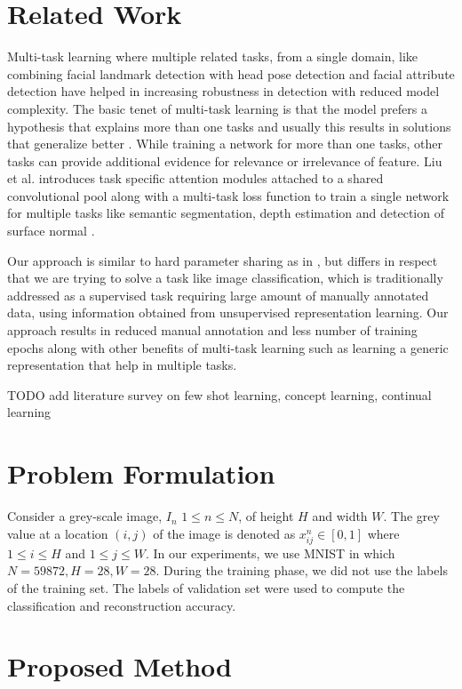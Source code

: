 \documentclass{uai2021} %
\begin{document}
\section{Related Work} \label{related_works}
Multi-task learning where multiple related tasks, from a single domain, like combining facial landmark detection with head pose detection and facial attribute detection \cite{zhang2014facial} have helped in increasing robustness in detection with reduced model complexity.
The basic tenet of multi-task learning is that the model prefers a hypothesis that explains more than one tasks and usually this results in solutions that generalize better \cite{ruder2017overview}.
While training a network for more than one tasks, other tasks can provide additional evidence for relevance or irrelevance of feature.
Liu et al. introduces task specific attention modules attached to a shared convolutional pool  along with a multi-task loss function to train a single network for multiple tasks like semantic segmentation, depth estimation and detection of surface normal \cite{liu2019end}.

Our approach is similar to hard parameter sharing as in \cite{zhang2014facial} \cite{dai2016instance}, but differs in respect that we are trying to solve a task like image classification, which is traditionally addressed as a supervised task requiring large amount of manually annotated data, using information obtained from  unsupervised representation learning.
Our approach results in reduced manual annotation and less number of training epochs along with other benefits of multi-task learning such as learning a generic representation that help in multiple tasks.

TODO add literature survey on few shot learning, concept learning, continual learning

\section{Problem Formulation} \label{problem_formulation}
Consider a grey-scale image, $I_n$  $1\leq n \leq N$,  of height  $H$ and width $W$. The grey value at a location $(i, j)$ of the image is denoted  as $x_{ij}^{n} \in [0,1]$  where $1 \leq i \leq H$  and  $1\leq j \leq W$.
In our experiments, we use MNIST in which $N= 59872, H=28,  W= 28$. During the training phase, we did not use the labels of the training set.
The labels of validation set were used to compute the classification and reconstruction accuracy.


\section{Proposed Method} \label{proposed_method}
\end{document}
